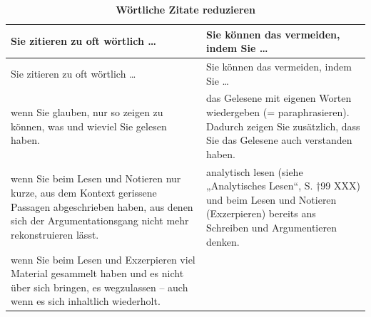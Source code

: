 \documentclass[]{book}
\theoremstyle{definition}
\theoremstyle{definition}
\theoremstyle{definition}
\theoremstyle{remark}
\begin{document}
\begin{longtable}[]{@{}ll@{}}
\caption{\textbf{\label{tab:paraphrasieren} Wörtliche Zitate
reduzieren}}\tabularnewline
\toprule
\begin{minipage}[b]{0.24\columnwidth}\raggedright\strut
Sie zitieren zu oft wörtlich \ldots{}\strut
\end{minipage} & \begin{minipage}[b]{0.70\columnwidth}\raggedright\strut
Sie können das vermeiden, indem Sie \ldots{}\strut
\end{minipage}\tabularnewline
\midrule
\endfirsthead
\toprule
\begin{minipage}[b]{0.24\columnwidth}\raggedright\strut
Sie zitieren zu oft wörtlich \ldots{}\strut
\end{minipage} & \begin{minipage}[b]{0.70\columnwidth}\raggedright\strut
Sie können das vermeiden, indem Sie \ldots{}\strut
\end{minipage}\tabularnewline
\midrule
\endhead
\begin{minipage}[t]{0.24\columnwidth}\raggedright\strut
wenn Sie glauben, nur so zeigen zu können, was und wieviel Sie gelesen
haben.\strut
\end{minipage} & \begin{minipage}[t]{0.70\columnwidth}\raggedright\strut
das Gelesene mit eigenen Worten wiedergeben (= paraphrasieren). Dadurch
zeigen Sie zusätzlich, dass Sie das Gelesene auch verstanden haben.
\vspace{-6mm}\strut
\end{minipage}\tabularnewline
\begin{minipage}[t]{0.24\columnwidth}\raggedright\strut
wenn Sie beim Lesen und Notieren nur kurze, aus dem Kontext gerissene
Passagen abgeschrieben haben, aus denen sich der Argumentationsgang
nicht mehr rekonstruieren lässt.\strut
\end{minipage} & \begin{minipage}[t]{0.70\columnwidth}\raggedright\strut
analytisch lesen (siehe „Analytisches Lesen``, S. †99 XXX) und beim
Lesen und Notieren (Exzerpieren) bereits ans Schreiben und Argumentieren
denken. \vspace{-6mm}\strut
\end{minipage}\tabularnewline
\begin{minipage}[t]{0.24\columnwidth}\raggedright\strut
wenn Sie beim Lesen und Exzerpieren viel Material gesammelt haben und es
nicht über sich bringen, es wegzulassen -- auch wenn es sich inhaltlich
wiederholt.\strut

\end{minipage}
\end{longtable}
\end{document}
